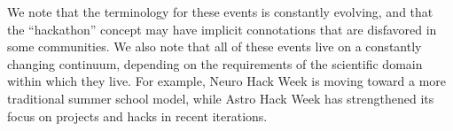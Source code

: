 We note that the terminology for these events is constantly evolving, and that the ``hackathon'' concept may have implicit connotations that are disfavored in some communities. We also note that all of these events live on a constantly changing continuum, depending on the requirements of the scientific domain within which they live. For example, Neuro Hack Week is moving toward a more traditional summer school model, while Astro Hack Week has strengthened its focus on projects and hacks in recent iterations.


